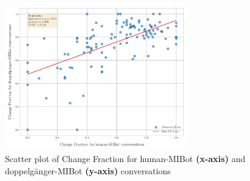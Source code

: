 \begin{figure}[ht!]
    \centering
    \includegraphics[width=0.7\textwidth]{fig/cf_doppelganger_human.pdf}
    \caption{Scatter plot of Change Fraction for human-MIBot \textbf{(x-axis)} and doppelgänger-MIBot \textbf{(y-axis)} conversations}
    \label{fig:cf_human_vs_doppel}
\end{figure}



